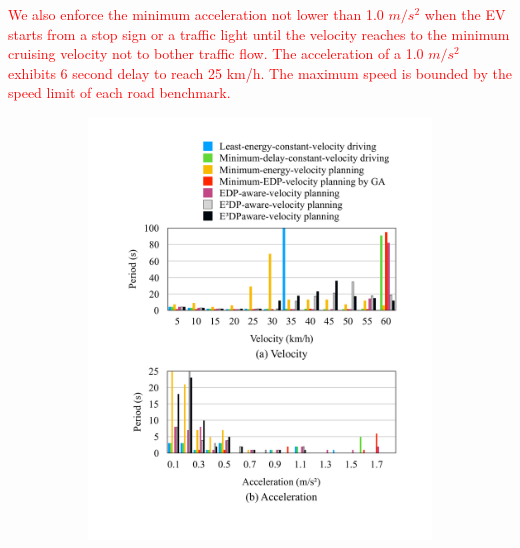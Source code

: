 \documentclass[onecolumn]{IEEEconf}
\begin{document}
\begin{description}
\textcolor{red}{We also enforce the minimum acceleration not lower than 1.0 $m/s^2$ when the EV starts from a stop sign or a traffic light until the velocity reaches to the minimum cruising velocity not to bother traffic flow. The acceleration of a 1.0 $m/s^2$ exhibits 6 second delay to reach 25 km/h. The maximum speed is bounded by the speed limit of each road benchmark.}


\begin{figure}[h!]
\centering
 \renewcommand\thefigure{11}
	\begin{subfigure}{0.45\textwidth}
	\includegraphics[width=\hsize]{Figures/Histogram_legend.pdf}
	\end{subfigure}
~\\
	\begin{subfigure}{0.45\textwidth}

\end{subfigure}
\end{figure}
\end{description}
\end{document}

